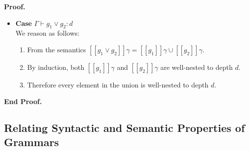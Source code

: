 \documentclass{article}
\newcommand{\lft}[1]{\left<{#1}\right.}
\newcommand{\rgt}[1]{\left.{#1}\right>}
\newcommand{\bnfalt}{\;\;|\;\;}
\newcommand{\judgebalance}[3][\Gamma]{{#1} \vdash {#2} : {#3}}
\newcommand{\interp}[1]{[\![{#1}]\!]}
\newenvironment{proof}{\noindent\textbf{Proof.}}{\noindent\textbf{End Proof.}}
\newenvironment{caseblock}{\begin{itemize}}{\end{itemize}}
\newenvironment{case}[1]{\item \textbf{Case} {#1}\\}{}
\begin{document}
\begin{proof}
\begin{caseblock}
  \begin{case}{$\judgebalance{g_1 \vee g_2}{d}$}
    We reason as follows:
    \begin{enumerate}
      \item From the semantics $\interp{g_1 \vee g_2}\gamma = \interp{g_1}\gamma \cup \interp{g_2}\gamma$.
      \item By induction, both $\interp{g_1}\gamma$ and $\interp{g_2}\gamma$ are well-nested to depth $d$.
      \item Therefore every element in the union is well-nested to depth $d$. 
    \end{enumerate}
    
  \end{case}
\end{caseblock}

\end{proof}


% 
% 
% 

\subsection{Relating Syntactic and Semantic Properties of Grammars}
\end{document}
